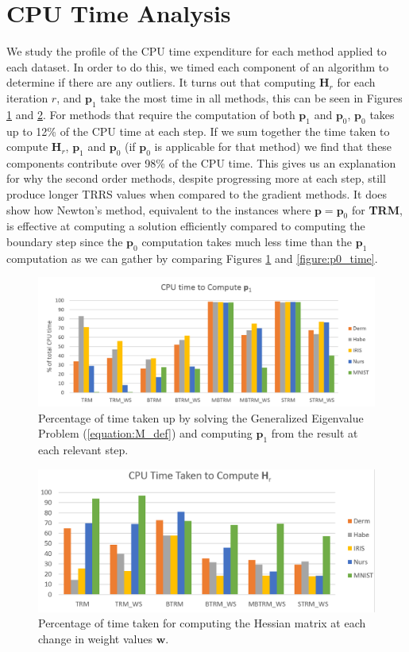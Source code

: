 \documentclass[letterpaper,12pt,titlepage,oneside,final]{book}
\begin{document}
	
	
	\section{CPU Time Analysis}
	We study the profile of the CPU time expenditure for each method applied to each dataset. In order to do this, we timed each component of an algorithm to determine if there are any outliers. It turns out that computing $\mathbf{H}_{r}$ for each iteration $r$, and $\mathbf{p}_{1}$ take the most time in all methods, this can be seen in Figures \ref{figure:p1_time} and \ref{figure:H_time}. For methods that require the computation of both $\mathbf{p}_{1}$ and $\mathbf{p}_{0}$, $\mathbf{p}_{0}$ takes up to 12\% of the CPU time at each step. If we sum together the time taken to compute $\mathbf{H}_{r}$, $\mathbf{p}_{1}$ and $\mathbf{p}_{0}$ (if $\mathbf{p}_{0}$ is applicable for that method) we find that these components contribute over 98\% of the CPU time. This gives us an explanation for why the second order methods, despite progressing more at each step, still produce longer TRRS values when compared to the gradient methods. It does show how Newton's method, equivalent to the instances where $\mathbf{p} = \mathbf{p}_{0}$ for \textbf{TRM}, is effective at computing a solution efficiently compared to computing the boundary step since the $\mathbf{p}_{0}$ computation takes much less time than the $\mathbf{p}_{1}$ computation as we can gather by comparing Figures \ref{figure:p1_time} and \ref{figure:p0_time}.
	\begin{figure}
		\centering
		\includegraphics[width=\textwidth]{images/CPU_time_p1}
		\caption{Percentage of time taken up by solving the Generalized Eigenvalue Problem (\ref{equation:M_def}) and computing $\mathbf{p}_{1}$ from the result at each relevant step.}
		\label{figure:p1_time}
	\end{figure}
	\begin{figure}
		\centering
		\includegraphics[width=\textwidth]{images/CPU_time_H}
		\caption{Percentage of time taken for computing the Hessian matrix at each change in weight values $\mathbf{w}$.}
		\label{figure:H_time}
	\end{figure}
\end{document}
